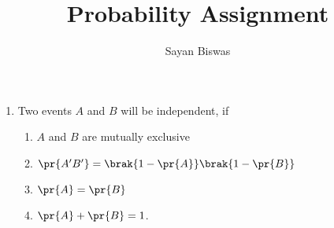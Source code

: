 \documentclass{article}
\begin{document}
\vspace{3cm}
\title{Probability Assignment}
\author{Sayan Biswas}
\maketitle
\bigskip
\begin{enumerate}
    \item Two events $A$ and $B$ will be independent, if
    \begin{enumerate}
        \item $A$ and $B$ are mutually exclusive
        \item $\pr{A'B'} = \brak{1 - \pr{A}}\brak{1 - \pr{B}}$
        \item $\pr{A} = \pr{B}$
        \item $\pr{A} + \pr{B} = 1$.
    \end{enumerate}


\end{enumerate}
\end{document}
